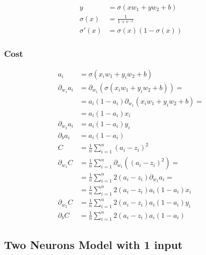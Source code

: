 \documentclass{article}
\begin{document}
\begin{center}
\end{center}
\begin{align}
  y &= \sigma(xw_1 + yw_2 + b) \\
  \sigma(x) &= \frac{1}{1 + e^{-x}} \\
  \sigma'(x) &= \sigma(x)(1 - \sigma(x))
\end{align}

\subsubsection{Cost}

\def\pd[#1]{\partial_{#1}}
\def\avgsum[#1,#2]{\frac{1}{#2}\sum_{#1=1}^{#2}}
\begin{align}
  a_i &= \sigma(x_iw_1 + y_iw_2 + b) \\
  \pd[w_1]a_i
      &= \pd[w_1](\sigma(x_iw_1 + y_iw_2 + b)) = \\
      &= a_i(1 - a_i)\pd[w_1](x_iw_1 + y_iw_2 + b) = \\
      &= a_i(1 - a_i)x_i \\
  \pd[w_2]a_i &= a_i(1 - a_i)y_i \\
  \pd[b]a_i &= a_i(1 - a_i) \\
  C &= \avgsum[i, n](a_i - z_i)^2 \\
  \pd[w_1] C
      &= \avgsum[i, n]\pd[w_1]\left((a_i - z_i)^2\right) = \\
      &= \avgsum[i, n]2(a_i - z_i)\pd[w_1]a_i = \\
      &= \avgsum[i, n]2(a_i - z_i)a_i(1 - a_i)x_i \\
  \pd[w_2] C &= \avgsum[i, n]2(a_i - z_i)a_i(1 - a_i)y_i \\
  \pd[b] C &= \avgsum[i, n]2(a_i - z_i)a_i(1 - a_i)
\end{align}

\subsection{Two Neurons Model with 1 input}

\begin{center}
\end{center}
\end{document}
